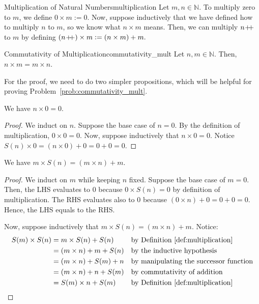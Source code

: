 \begin{definition}{Multiplication of Natural Numbers}{multiplication}
    Let $m, n \in \mathbb{N}.$
    To multiply zero to $m$, we define $0 \times m := 0.$
    Now, suppose inductively that we have defined how to multiply $n$ to $m$, so we know what $n \times m$ means.
    Then, we can multiply $n \! +\!\!\!+$ to $m$ by defining $(n \! +\!\!\!+) \times m := (n \times m) + m.$
\end{definition}
\begin{problem_labelled}{Commutativity of Multiplication}{commutativity_mult}
    Let $n, m \in \mathbb{N}.$ 
    Then, $n \times m = m \times n.$ 
\end{problem_labelled}
For the proof, we need to do two simpler propositions, which will be helpful for proving Problem~\ref{prob:commutativity_mult}.
\begin{proposition}
    We have $n \times 0 = 0.$
\end{proposition}
\begin{proof}
    We induct on $n$. 
    Suppose the base case of $n = 0.$ 
    By the definition of multiplication, $0 \times 0 = 0.$
    Now, suppose inductively that $n \times 0 = 0.$
    Notice $S(n) \times 0 = (n \times 0) + 0 = 0 + 0 = 0.$
\end{proof}

\begin{proposition}
    We have $m \times S(n) = (m \times n) + m.$
\end{proposition}
\begin{proof}
    We induct on $m$ while keeping $n$ fixed.
    Suppose the base case of $m = 0.$
    Then, the LHS evaluates to 0 because $0 \times S(n) = 0$ by definition of multiplication.
    The RHS evaluates also to 0 because $(0 \times n) + 0 = 0 + 0 = 0.$ 
    Hence, the LHS equals to the RHS.

    Now, suppose inductively that $m \times S(n)= (m \times n) + m.$
    Notice:
    \begin{align*}
        S(m) \times S(n) &= m \times S(n) + S(n) &&\text{by Definition~\ref{def:multiplication}} \\
        &= (m \times n ) + m + S(n) &&\text{by the inductive hypothesis} \\
        &= (m \times n) + S(m) + n &&\text{by manipulating the successor function} \\
        &= (m \times n) + n + S(m)  &&\text{by commutativity of addition} \\
        &= S(m) \times n + S(m) &&\text{by Definition~\ref{def:multiplication}}
    \end{align*} 
\end{proof}

